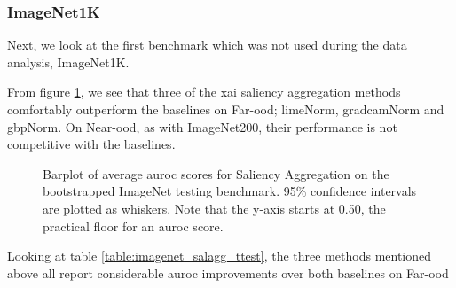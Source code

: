 \documentclass[UKenglish]{uiomasterthesis} %
\theoremstyle{definition}
\begin{document}
\newpage

\subsubsection{ImageNet1K}

Next, we look at the first benchmark which was not used during the data analysis, ImageNet1K. 

From figure \ref{fig:imagenet_salagg_bootstrap_barplot}, we see that three of the \ac{xai} saliency aggregation methods comfortably outperform the baselines on Far-\ac{ood}; \ac{lime}Norm, \ac{gradcam}Norm and \ac{gbp}Norm. On Near-\ac{ood}, as with ImageNet200, their performance is not competitive with the baselines.

\begin{figure}[hbtp]
    \begin{center}
        
    \end{center}
    \caption[ImageNet1K Saliency Aggregation Bootstrap]{Barplot of average \ac{auroc} scores for Saliency Aggregation on the bootstrapped ImageNet testing benchmark. 95\% confidence intervals are plotted as whiskers. Note that the y-axis starts at 0.50, the practical floor for an \ac{auroc} score.}
    \label{fig:imagenet_salagg_bootstrap_barplot}
\end{figure}

Looking at table \ref{table:imagenet_salagg_ttest}, the three methods mentioned above all report considerable \ac{auroc} improvements over both baselines on Far-\ac{ood}
\end{document}
